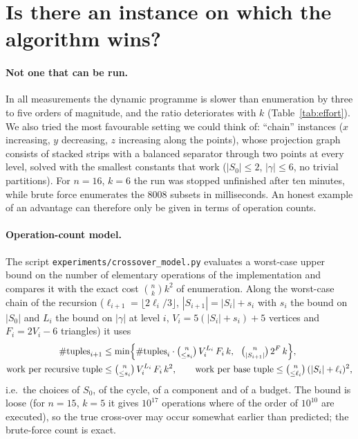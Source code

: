 \documentclass[12pt,a4paper]{article}
\newcommand{\code}[1]{\texttt{#1}}
\begin{document}
\section{Is there an instance on which the algorithm wins?}
\label{sec:crossover}
\paragraph{Not one that can be run.}
In all measurements the dynamic programme is slower than enumeration by three to five orders of magnitude,
and the ratio deteriorates with $k$ (Table~\ref{tab:effort}).  We also tried the most favourable setting we could
think of: ``chain'' instances ($x$ increasing, $y$ decreasing, $z$ increasing along the points), whose
projection graph consists of stacked strips with a balanced separator through two points at every level, solved
with the smallest constants that work ($|S_0|\le 2$, $|\gamma|\le 6$, no trivial partitions).  For $n=16$, $k=6$
the run was stopped unfinished after ten minutes, while brute force enumerates the $8008$ subsets in
milliseconds.  An honest example of an advantage can therefore only be given in terms of operation counts.

\paragraph{Operation-count model.}
The script \code{experiments/crossover\_model.py} evaluates a worst-case upper bound on the number of elementary
operations of the implementation and compares it with the exact cost $\binom{n}{k}k^2$ of enumeration.  Along
the worst-case chain of the recursion ($\ell_{i+1}=\lfloor 2\ell_i/3\rfloor$, $|S_{i+1}|=|S_i|+s_i$ with
$s_i$ the bound on $|S_0|$ and $L_i$ the bound on $|\gamma|$ at level $i$, $V_i=5(|S_i|+s_i)+5$ vertices and $F_i=2V_i-6$
triangles) it uses
\begin{align*}
 \#\text{tuples}_{i+1} &\le \min\Bigl\{\#\text{tuples}_i\cdot\tbinom{n}{\le s_i}\,V_i^{L_i}\,F_i\,k,\ \
                          \tbinom{n}{|S_{i+1}|}\,2^{F}\,k\Bigr\},\\
 \text{work per recursive tuple} &\le \tbinom{n}{\le s_i}\,V_i^{L_i}\,F_i\,k^2,\qquad
 \text{work per base tuple} \le \tbinom{n}{\le \ell_i}\,(|S_i|+\ell_i)^2 ,
\end{align*}
i.e.\ the choices of $S_0$, of the cycle, of a component and of a budget.  The bound is loose (for $n=15$,
$k=5$ it gives $10^{17}$ operations where of the order of $10^{10}$ are executed), so the true cross-over may
occur somewhat earlier than predicted; the brute-force count is exact.
\end{document}
